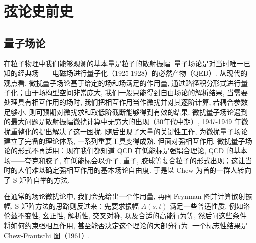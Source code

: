 \documentclass[10pt]{article}
\numberwithin{equation}{section}
\begin{document}
\section{弦论史前史}

\subsection{量子场论}

在粒子物理中我们能够观测的基本量是粒子的散射振幅. 量子场论是对当时唯一已知的经典场——电磁场进行量子化（1925-1928）的必然产物（QED）. 从现代的观点看, 微扰量子场论基于给定的场和场满足的作用量, 通过路径积分形式进行量子化；由于场构型空间非常庞大, 我们一般只能得到自由场论的解析结果, 当需要处理具有相互作用的场时, 我们把相互作用当作微扰并对其逐阶计算, 若耦合参数足够小, 则可预期对微扰求和取低阶截断能够得到有效的结果. 微扰量子场论遇到的最大问题是散射振幅微扰计算中无穷大的出现（30年代中期）, 1947-1949 年微扰重整化的提出解决了这一困扰. 随后出现了大量的关键性工作, 为微扰量子场论建立了完备的理论体系, 一系列重要工具变得成熟. 但面对强相互作用, 微扰量子场论的形式不再适用：现在我们都知道 QCD 在低能标是强耦合理论, QCD 的基本场——夸克和胶子, 在低能标会以介子, 重子, 胶球等复合粒子的形式出现；这让当时的人们难以确定强相互作用的基本场论自由度. 于是以 Chew 为首的一群人转向了 S-矩阵自举的方法. 

在通常的场论微扰论中, 我们会先给出一个作用量, 再画 Feynman 图并计算散射振幅. S-矩阵方法的思路则反过来：先要求振幅 $A (s, t)$ 满足一些普适性质, 例如洛伦兹不变性, 幺正性, 解析性, 交叉对称, 以及合适的高能行为等, 然后问这些条件将如何约束强相互作用, 甚至能否决定这个理论的大部分行为. 一个标志性结果是 Chew-Frautschi 图（1961）\cite{ChewFrautschi1961,CappelliEtAl2012}. 
\end{document}
